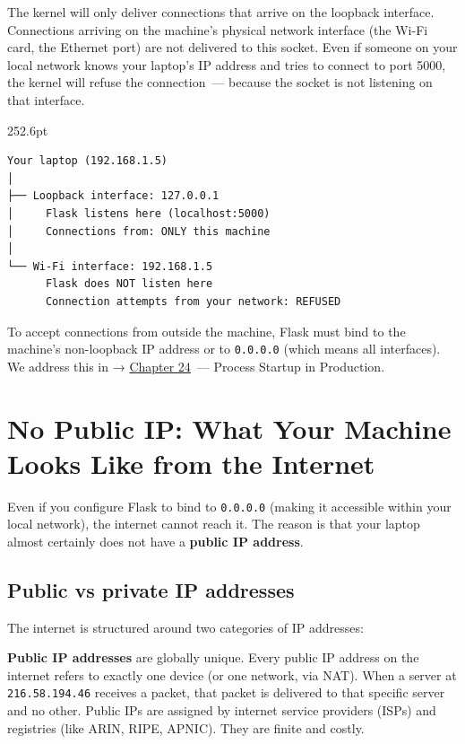 \noindent{}The kernel will only deliver connections that arrive on the loopback interface. Connections arriving on the machine's physical network interface (the Wi-Fi card, the Ethernet port) are not delivered to this socket. Even if someone on your local network knows your laptop's IP address and tries to connect to port 5000, the kernel will refuse the connection~--- because the socket is not listening on that interface.

\begin{diagrambox}[short]{252.6pt}
\begin{Verbatim}[fontsize=\fontsize{9.0}{8.55}\selectfont]
Your laptop (192.168.1.5)
│
├── Loopback interface: 127.0.0.1
│     Flask listens here (localhost:5000)
│     Connections from: ONLY this machine
│
└── Wi-Fi interface: 192.168.1.5
      Flask does NOT listen here
      Connection attempts from your network: REFUSED
\end{Verbatim}
\end{diagrambox}

\noindent{}To accept connections from outside the machine, Flask must bind to the machine's non-loopback IP address or to \texttt{0.0.0.0} (which means all interfaces). We address this in → \hyperref[ch:24-process-startup]{Chapter 24}~--- Process Startup in Production.

\setcounter{section}{1}
\section{No Public IP: What Your Machine Looks Like from the Internet}\label{10-networking-limitations:102-no-public-ip-what-your-machine-looks-like-from-the-internet}

Even if you configure Flask to bind to \texttt{0.0.0.0} (making it accessible within your local network), the internet cannot reach it. The reason is that your laptop almost certainly does not have a \textbf{public IP address}.

\subsection*{Public vs private IP addresses}\label{10-networking-limitations:public-vs-private-ip-addresses}

The internet is structured around two categories of IP addresses:

\textbf{Public IP addresses} are globally unique. Every public IP address on the internet refers to exactly one device (or one network, via NAT). When a server at \texttt{216.58.194.46} receives a packet, that packet is delivered to that specific server and no other. Public IPs are assigned by internet service providers (ISPs) and registries (like ARIN, RIPE, APNIC). They are finite and costly.

